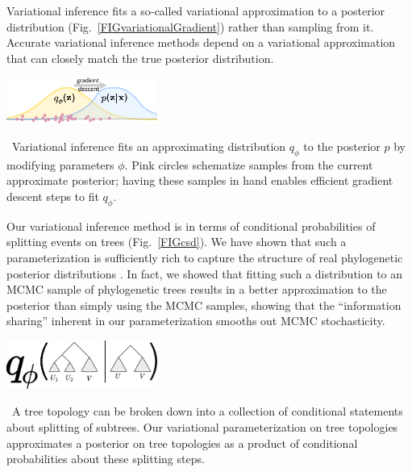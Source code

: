\documentclass[nobib]{tufte-handout}
\begin{document}
Variational inference fits a so-called variational approximation to a posterior distribution (Fig.~\ref{FIGvariationalGradient}) rather than sampling from it.
Accurate variational inference methods depend on a variational approximation that can closely match the true posterior distribution.

\begin{marginfigure}[0.in]%
  \includegraphics[width=1.95in]{variational-gradient}
  \caption{\
    Variational inference fits an approximating distribution $q_\phi$ to the posterior $p$ by modifying parameters $\phi$.
    Pink circles schematize samples from the current approximate posterior; having these samples in hand enables efficient gradient descent steps to fit $q_\phi$.
    }
  \label{FIGvariationalGradient}
\end{marginfigure}%

Our variational inference method is in terms of conditional probabilities of splitting events on trees (Fig.~\ref{FIGcsd}).
We have shown that such a parameterization is sufficiently rich to capture the structure of real phylogenetic posterior distributions \cite{Zhang2018-mm}.
In fact, we showed that fitting such a distribution to an MCMC sample of phylogenetic trees results in a better approximation to the posterior than simply using the MCMC samples, showing that the ``information sharing'' inherent in our parameterization smooths out MCMC stochasticity.

\begin{marginfigure}[0.7in]%
  \includegraphics[width=1.95in]{csd}
  \caption{\
    A tree topology can be broken down into a collection of conditional statements about splitting of subtrees.
    Our variational parameterization on tree topologies approximates a posterior on tree topologies as a product of conditional probabilities about these splitting steps.
    }
  \label{FIGcsd}
\end{marginfigure}%
\end{document}
